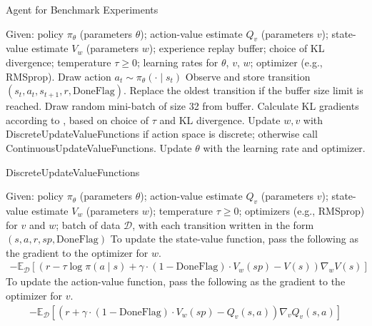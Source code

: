 \documentclass[twoside,11pt]{article}
\newcommand{\Ex}{\mathbb{E}}
\begin{document}
\begin{algorithm}
\caption{Agent for Benchmark Experiments}
\label{alg:kl-agent}
\begin{algorithmic}
    \State Given: policy $\pi_\theta$ (parameters $\theta$); action-value estimate $Q_v$ (parameters $v$); state-value estimate $V_w$ (parameters $w$); experience replay buffer; choice of KL divergence; temperature $\tau \geq 0$; learning rates for $\theta$, $v$, $w$; optimizer (e.g., RMSprop).
        \State Draw action $a_t \sim \pi_\theta(\cdot \mid s_t)$
        \State Observe and store transition $(s_t, a_t, s_{t + 1}, r, \text{DoneFlag})$. Replace the oldest transition if the buffer size limit is reached. 
            \State Draw random mini-batch of size 32 from buffer. 
                \State Calculate KL gradients according to , based on choice of $\tau$ and KL divergence.
            \EndFor
            \State Update $w, v$ with DiscreteUpdateValueFunctions if action space is discrete; otherwise call ContinuousUpdateValueFunctions.
            \State Update $\theta$ with the learning rate and optimizer.
        \EndIf
    \EndFor
\end{algorithmic}
\end{algorithm}

\begin{algorithm}
\caption{DiscreteUpdateValueFunctions}
\label{alg:discrete-value-update}
\begin{algorithmic}
    \State Given: policy $\pi_\theta$ (parameters $\theta$); action-value estimate $Q_v$ (parameters $v$); state-value estimate $V_w$ (parameters $w$); temperature $\tau \geq 0$;  optimizers (e.g., RMSprop) for $v$ and $w$; batch of data $\mathcal{D}$, with each transition written in the form $(s, a, r, sp, \text{DoneFlag})$
    \State To update the state-value function, pass the following as the gradient to the optimizer for $w$. 
    \begin{align*}
        -\Ex_{\mathcal{D}}[(r - \tau \log \pi(a \mid s) + \gamma\cdot (1 - \text{DoneFlag})\cdot V_w(sp) - V(s)) \nabla_w V(s)]
    \end{align*}
    \State To update the action-value function, pass the following as the gradient to the optimizer for $v$. 
    \begin{align*}
        -\Ex_{\mathcal{D}}[(r + \gamma \cdot (1 - \text{DoneFlag})\cdot V_w(sp) - Q_v(s, a)) \nabla_v Q_v(s, a)]
    \end{align*}
\end{algorithmic}
\end{algorithm}
\end{document}
